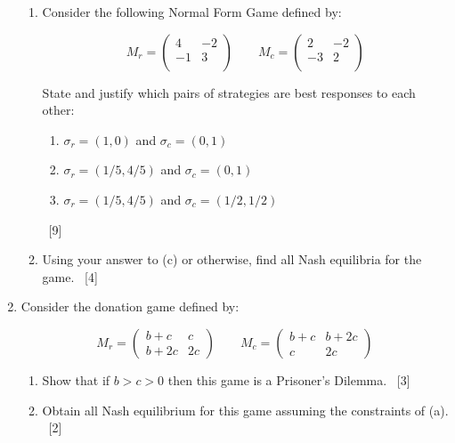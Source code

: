 \documentclass[12pt,a4paper]{article}
\begin{document}
\begin{enumerate}
\begin{enumerate}
        \item Consider the following Normal Form Game defined by:

            \[
                M_r=
\begin{pmatrix}
4 & -2 \\
-1 & 3 \\
\end{pmatrix}
\qquad
            M_c=
\begin{pmatrix}
2 & -2 \\
-3 & 2 \\
\end{pmatrix}
\]

        State and justify which pairs of strategies are best responses to each
            other:
            \begin{enumerate}
                \item \(\sigma_r=(1, 0)\) and \(\sigma_c=(0, 1)\)
                \item \(\sigma_r=(1/5, 4/5)\) and \(\sigma_c=(0, 1)\)
                \item \(\sigma_r=(1/5, 4/5)\) and \(\sigma_c=(1/2, 1/2)\)
            \end{enumerate}
            ~\hfill{[9]}


        \item Using your answer to (c) or otherwise, find all Nash equilibria
            for the game.
            ~\hfill{[4]}
        
    \end{enumerate}

\newpage

\item
    Consider the donation game defined by:

    \[
        M_r = 
        \begin{pmatrix}    
            b + c & c\\
            b + 2 c    & 2 c
        \end{pmatrix}
        \qquad
        M_c = 
        \begin{pmatrix}    
            b + c & b + 2c\\
            c    & 2 c
        \end{pmatrix}
    \]


    \begin{enumerate}
        \item Show that if \(b>c>0\) then this game is a Prisoner's Dilemma.
            ~\hfill{[3]}
    \item Obtain all Nash equilibrium for this game assuming the constraints of
        (a).
            ~\hfill{[2]}


\end{enumerate}
\end{enumerate}
\end{document}

